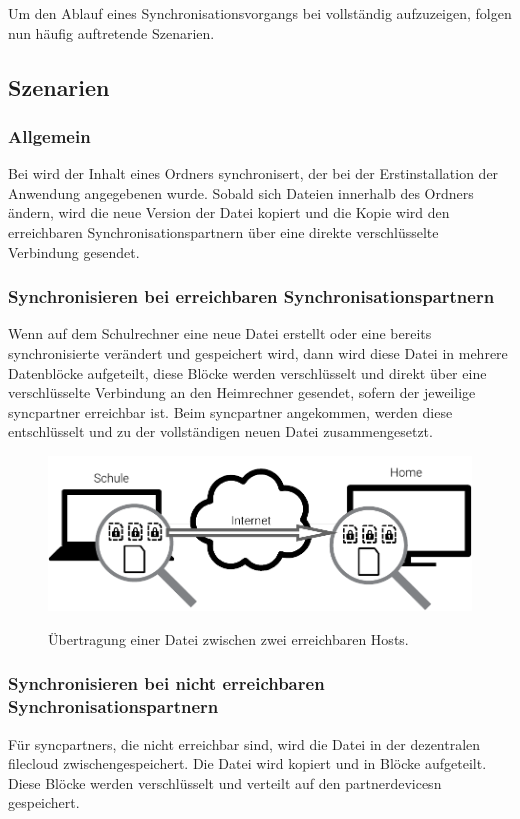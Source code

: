 Um den Ablauf eines Synchronisationsvorgangs bei \sblit vollständig aufzuzeigen,
folgen nun häufig auftretende Szenarien.

\subsection{Szenarien}
\subsubsection{Allgemein}
Bei \sblit wird der Inhalt eines Ordners synchronisert, der bei der
Erstinstallation der Anwendung angegebenen wurde. Sobald sich Dateien innerhalb des Ordners
ändern, wird die neue Version der Datei kopiert und die Kopie wird den
erreichbaren Synchronisationspartnern über eine direkte verschlüsselte Verbindung
gesendet.

\subsubsection{Synchronisieren bei erreichbaren Synchronisationspartnern}
Wenn auf dem Schulrechner eine neue Datei erstellt oder eine bereits synchronisierte verändert und
gespeichert wird, dann wird diese Datei in mehrere Datenblöcke
aufgeteilt, diese Blöcke werden verschlüsselt und direkt über eine verschlüsselte
Verbindung an den Heimrechner gesendet, sofern der jeweilige \gls{syncpartner}
erreichbar ist. Beim \gls{syncpartner} angekommen, werden diese
entschlüsselt und zu der vollständigen neuen Datei zusammengesetzt.

\begin{figure}[htb]
	\centering
  \includegraphics[]{images/sblit_p2p}
	\label{sblit_p2p}
  \caption{Übertragung einer Datei zwischen zwei erreichbaren Hosts.}
\end{figure}

\subsubsection{Synchronisieren bei nicht erreichbaren Synchronisationspartnern}
Für \glspl{syncpartner}, die nicht erreichbar sind, wird die Datei in der dezentralen
\gls{filecloud} zwischengespeichert. Die Datei wird kopiert und in Blöcke
aufgeteilt. Diese Blöcke werden verschlüsselt und verteilt auf den
\glspl{partnerdevice}n gespeichert.

